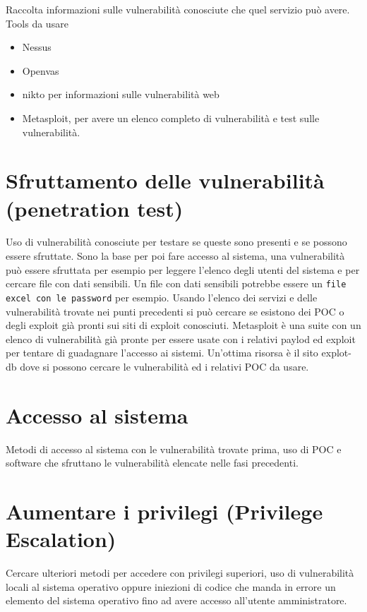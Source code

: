 \documentclass[a4paper,12pt]{article}
\begin{document}
Raccolta informazioni sulle vulnerabilità conosciute che quel servizio può avere.
Tools da usare
\begin{itemize}
   
  \item Nessus\cite{nessus}
  \item Openvas \cite{openvas}
  \item nikto\cite{nikto} per informazioni sulle vulnerabilità web
  \item Metasploit\cite{metasploit}, per avere un elenco completo di vulnerabilità e test sulle vulnerabilità.
\end{itemize}

\section{  Sfruttamento delle vulnerabilità (penetration test) }

Uso di vulnerabilità conosciute per testare se queste sono presenti e se possono essere sfruttate. Sono la base per poi fare accesso al sistema, una vulnerabilità può essere sfruttata per esempio per leggere l'elenco degli utenti del sistema e per cercare file con dati sensibili. Un file con dati sensibili potrebbe essere un \texttt{file excel con le password} per esempio. 
Usando l'elenco dei servizi e delle vulnerabilità trovate nei punti precedenti si può cercare se esistono dei POC o degli exploit già pronti sui siti di exploit conosciuti. Metasploit\cite{metasploit} è una suite con un elenco di vulnerabilità già pronte per essere usate con i relativi paylod ed exploit per tentare di guadagnare l'accesso ai sistemi.
Un'ottima risorsa è il sito explot-db\cite{explot-db} dove si possono cercare le vulnerabilità ed i relativi POC da usare.

\section{ Accesso al sistema }

Metodi di accesso al sistema con le vulnerabilità trovate prima, uso di POC e software che sfruttano le vulnerabilità elencate nelle fasi precedenti.

\section{  Aumentare i privilegi (Privilege Escalation) }

Cercare ulteriori metodi per accedere con privilegi superiori, uso di vulnerabilità locali  al sistema operativo oppure iniezioni di codice che manda in  errore un elemento del sistema operativo fino ad avere accesso all'utente amministratore.
\end{document}
